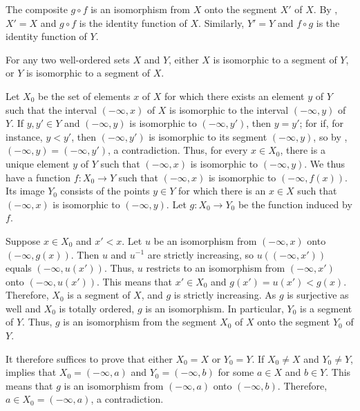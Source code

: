 \documentclass{article}
\begin{document}
The composite \(g \circ f\) is an isomorphism from \(X\) onto the
segment \(X'\) of \(X\).  By , \(X' = X\) and
\(g \circ f\) is the identity function of \(X\).  Similarly,
\(Y' = Y\) and \(f \circ g\) is the identity function of \(Y\).

\begin{theorem}
  \label{thm:vy95iuyi}
  For any two well-ordered sets \(X\) and \(Y\), either \(X\) is
  isomorphic to a segment of \(Y\), or \(Y\) is isomorphic to a
  segment of \(X\).
\end{theorem}

Let \(X_0\) be the set of elements \(x\) of \(X\) for which there
exists an element \(y\) of \(Y\) such that the interval
\((-\infty, x)\) of \(X\) is isomorphic to the interval
\((-\infty, y)\) of \(Y\).  If \(y, y' \in Y\) and \((-\infty, y)\) is
isomorphic to \((-\infty, y')\), then \(y = y'\); for if, for instance,
\(y < y'\), then \((-\infty, y')\) is isomorphic to its segment
\((-\infty, y)\), so by ,
\((-\infty, y) = (-\infty, y')\), a contradiction.  Thus, for every
\(x \in X_0\), there is a unique element \(y\) of \(Y\) such that
\((-\infty, x)\) is isomorphic to \((-\infty, y)\).  We thus have a
function \(f : X_0 \to Y\) such that \((-\infty, x)\) is isomorphic to
\((-\infty, f(x))\).  Its image \(Y_0\) consists of the points
\(y \in Y\) for which there is an \(x \in X\) such that
\((-\infty, x)\) is isomorphic to \((-\infty, y)\).  Let
\(g : X_0 \to Y_0\) be the function induced by \(f\).

Suppose \(x \in X_0\) and \(x' < x\).  Let \(u\) be an isomorphism
from \((-\infty, x)\) onto \((-\infty, g(x))\).  Then \(u\) and
\(u^{-1}\) are strictly increasing, so \(u((-\infty, x'))\) equals
\((-\infty, u(x'))\).  Thus, \(u\) restricts to an isomorphism from
\((-\infty, x')\) onto \((-\infty, u(x'))\).  This means that
\(x' \in X_0\) and \(g(x') = u(x') < g(x)\).  Therefore, \(X_0\) is a
segment of \(X\), and \(g\) is strictly increasing.  As \(g\) is
surjective as well and \(X_0\) is totally ordered, \(g\) is an
isomorphism.  In particular, \(Y_0\) is a segment of \(Y\).  Thus,
\(g\) is an isomorphism from the segment \(X_0\) of \(X\) onto the
segment \(Y_0\) of \(Y\).

It therefore suffices to prove that either \(X_0 = X\) or \(Y_0 = Y\).
If \(X_0 \neq X\) and \(Y_0 \neq Y\),  implies that
\(X_0 = (-\infty, a)\) and \(Y_0 = (-\infty, b)\) for some \(a \in X\)
and \(b \in Y\).  This means that \(g\) is an isomorphism from
\((-\infty, a)\) onto \((-\infty, b)\).  Therefore,
\(a \in X_0 = (-\infty, a)\), a contradiction.
\end{document}
